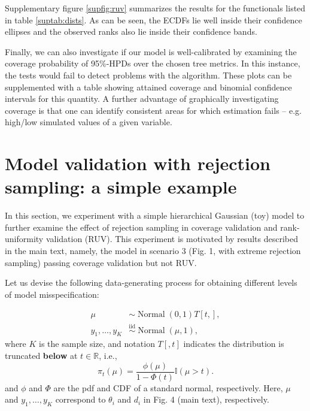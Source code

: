\documentclass[oneside]{article}
\begin{document}
Supplementary figure \ref{supfig:ruv} summarizes the results for the functionals
listed in table \ref{suptab:dists}.
As can be seen, the ECDFs lie well inside their confidence ellipses
and the observed ranks also lie inside their confidence bands.

Finally, we can also investigate if our model is well-calibrated
by examining the coverage probability of 95\%-HPDs over the chosen
tree metrics.
In this instance, the tests would fail to detect problems with the algorithm.
These plots can be supplemented with a table showing attained coverage and binomial confidence intervals for this quantity.
A further advantage of graphically investigating coverage is that one can identify consistent areas for which estimation fails -- e.g. high/low simulated values of a given variable.

\newpage
\section{Model validation with rejection sampling: a simple example}
\label{sec:supp_toy}

In this section, we experiment with a simple hierarchical Gaussian (toy) model to further examine the effect of rejection sampling in coverage validation and
rank-uniformity validation (RUV).
This experiment is motivated by results described in the main text, namely, the model in scenario 3 (Fig. 1, with extreme rejection sampling) passing coverage validation but not RUV.

Let us devise the following data-generating process for obtaining different levels of model misspecification:

\begin{align*}
 \mu & \sim \operatorname{Normal}\left(0, 1\right)T[t, ],\\
  y_1, \ldots, y_K & \overset{\text{iid}}{\sim} \operatorname{Normal}\left(\mu, 1\right),
\end{align*}
where $K$ is the sample size, and notation $T[, t]$ indicates the distribution is truncated \textbf{below} at $t \in \mathbb{R}$, i.e.,
\begin{equation*}
    \pi_{t}(\mu) = \frac{\phi(\mu)}{1 - \Phi(t)} \mathbb{I}(\mu > t).
\end{equation*}
and $\phi$ and $\Phi$ are the pdf and CDF of a standard normal, respectively.
Here, $\mu$ and $y_1, \ldots, y_K$ correspond to $\theta_i$ and $d_i$ in Fig. 4 (main text), respectively.
\end{document}
